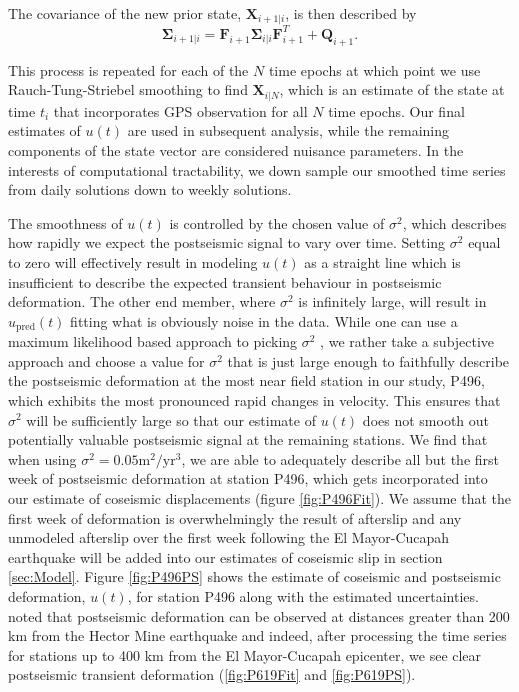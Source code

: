 \documentclass[12pt]{article}
\begin{document}
The covariance of the new prior state, $\mathbf{X}_{i+1|i}$, is then described by
\begin{equation}
  \mathbf{\Sigma}_{i+1|i} = \mathbf{F}_{i+1}\mathbf{\Sigma}_{i|i}\mathbf{F}^T_{i+1} + \mathbf{Q}_{i+1}.
\end{equation}

This process is repeated for each of the $N$ time epochs at which point we use Rauch-Tung-Striebel smoothing \citep{Rauch1965} to find $\mathbf{X}_{i|N}$, which is an estimate of the state at time $t_i$ that incorporates GPS observation for all $N$ time epochs.  Our final estimates of $u(t)$ are used in subsequent analysis, while the remaining components of the state vector are considered nuisance parameters. In the interests of computational tractability, we down sample our smoothed time series from daily solutions down to weekly solutions.

The smoothness of $u(t)$ is controlled by the chosen value of $\sigma^2$, which describes how rapidly we expect the postseismic signal to vary over time.  Setting $\sigma^2$ equal to zero will effectively result in modeling $u(t)$ as a straight line which is insufficient to describe the expected transient behaviour in postseismic deformation. The other end member, where $\sigma^2$ is infinitely large, will result in $u_\mathrm{pred}(t)$ fitting what is obviously noise in the data. While one can use a maximum likelihood based approach to picking $\sigma^2$ \citep[e.g.][]{Segall1997}, we rather take a subjective approach and choose a value for $\sigma^2$ that is just large enough to faithfully describe the postseismic deformation at the most near field station in our study, P496, which exhibits the most pronounced rapid changes in velocity. This ensures that $\sigma^2$ will be sufficiently large so that our estimate of $u(t)$ does not smooth out potentially valuable postseismic signal at the remaining stations. We find that when using $\sigma^2 = 0.05 \mathrm{m}^2 / \mathrm{yr}^3$, we are able to adequately describe all but the first week of postseismic deformation at station P496, which gets incorporated into our estimate of coseismic displacements (figure \ref{fig:P496Fit}). We assume that the first week of deformation is overwhelmingly the result of afterslip and any unmodeled afterslip over the first week following the El Mayor-Cucapah earthquake will be added into our estimates of coseismic slip in section \ref{sec:Model}.  Figure \ref{fig:P496PS} shows the estimate of coseismic and postseismic deformation, $u(t)$, for station P496 along with the estimated uncertainties. \cite{Freed2007a} noted that postseismic deformation can be observed at distances greater than 200 km from the Hector Mine earthquake and indeed, after processing the time series for stations up to 400 km from the El Mayor-Cucapah epicenter, we see clear postseismic transient deformation (\ref{fig:P619Fit} and \ref{fig:P619PS}).      
\end{document}
